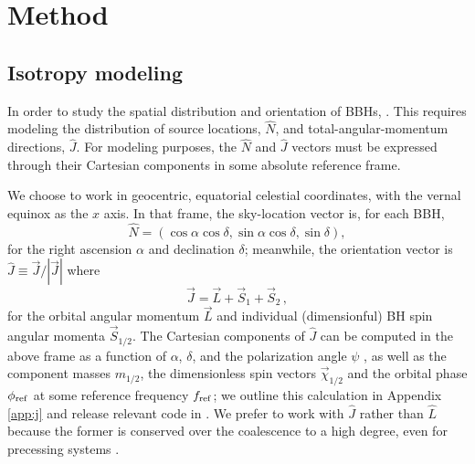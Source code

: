 \documentclass[twocolumn,twocolappendix,linenumbers]{aastex631}
\begin{document}
\section{Method}
\label{sec:method}

\subsection{Isotropy modeling}

\newcommand*{\dip}[1]{\vec{v}_{#1}}
\newcommand*{\dipraw}[1]{\vec{u}_{#1}}

In order to study the spatial distribution and orientation of \acp{BBH}, .
This requires modeling the distribution of source locations, $\hat{N}$, and total-angular-momentum directions, $\hat{J}$.
For modeling purposes, the $\hat{N}$ and $\hat{J}$ vectors must be expressed through their Cartesian components in some absolute reference frame.

We choose to work in geocentric, equatorial celestial coordinates, with the vernal equinox as the $x$ axis.
In that frame, the sky-location vector is, for each \ac{BBH},
\begin{equation} \label{eq:n}
\hat{N} = \left( \cos\alpha \cos\delta, \sin\alpha \cos\delta, \sin\delta \right) ,
\end{equation}
for the right ascension $\alpha$ and declination $\delta$; meanwhile, the orientation vector is $\hat{J} \equiv \vec{J} / |\vec{J}|$ where
\begin{equation} \label{eq:j}
\vec{J} = \vec{L} + \vec{S}_1 + \vec{S}_2 \, ,
\end{equation}
for the orbital angular momentum $\vec{L}$ and individual (dimensionful) \ac{BH} spin angular momenta $\vec{S}_{1/2}$.
The Cartesian components of $\hat{J}$ can be computed in the above frame as a function of $\alpha$, $\delta$, and the polarization angle $\psi$ \citep{Isi:2022mbx}, as well as the component masses $m_{1/2}$, the dimensionless spin vectors $\vec{\chi}_{1/2}$ and the orbital phase $\phi_{\rm ref}$ at some reference frequency $f_{\rm ref}$; we outline this calculation in Appendix \ref{app:j} and release relevant code in \citet{repo}.
We prefer to work with $\hat{J}$ rather than $\hat{L}$ because the former is conserved over the coalescence to a high degree, even for precessing systems \citep{poisson2014gravity}.
\end{document}

